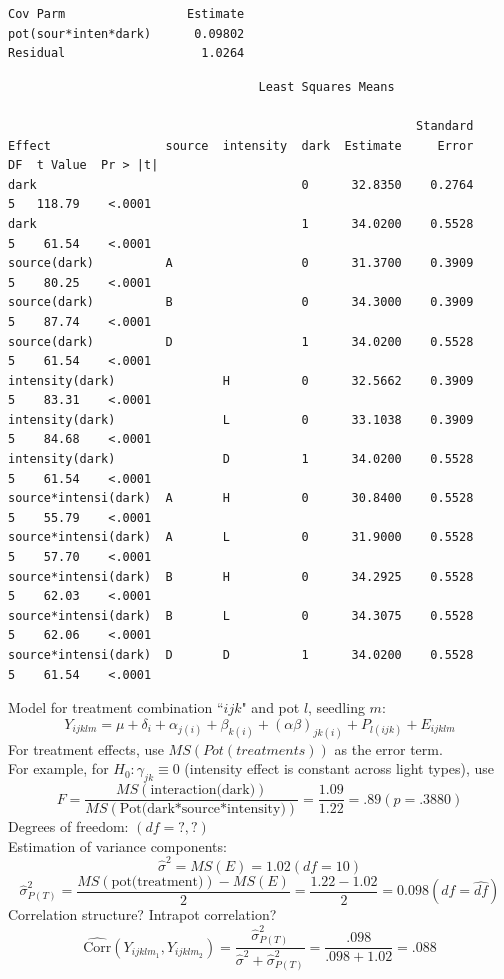 \begin{LARGE}
\begin{small}
\begin{verbatim}
Cov Parm                 Estimate
pot(sour*inten*dark)      0.09802
Residual                   1.0264
\end{verbatim}
\newpage
\begin{verbatim}
                                   Least Squares Means
 
                                                         Standard
Effect                source  intensity  dark  Estimate     Error    DF  t Value  Pr > |t|
dark                                     0      32.8350    0.2764     5   118.79    <.0001
dark                                     1      34.0200    0.5528     5    61.54    <.0001
source(dark)          A                  0      31.3700    0.3909     5    80.25    <.0001
source(dark)          B                  0      34.3000    0.3909     5    87.74    <.0001
source(dark)          D                  1      34.0200    0.5528     5    61.54    <.0001
intensity(dark)               H          0      32.5662    0.3909     5    83.31    <.0001
intensity(dark)               L          0      33.1038    0.3909     5    84.68    <.0001
intensity(dark)               D          1      34.0200    0.5528     5    61.54    <.0001
source*intensi(dark)  A       H          0      30.8400    0.5528     5    55.79    <.0001
source*intensi(dark)  A       L          0      31.9000    0.5528     5    57.70    <.0001
source*intensi(dark)  B       H          0      34.2925    0.5528     5    62.03    <.0001
source*intensi(dark)  B       L          0      34.3075    0.5528     5    62.06    <.0001
source*intensi(dark)  D       D          1      34.0200    0.5528     5    61.54    <.0001
\end{verbatim}
\end{small}
Model for treatment combination ``$ijk$" and pot $l$, seedling $m$:
$$ Y_{ijklm} = \mu  + \delta_i + \alpha_{j(i)} + \beta_{k(i)} + (\alpha\beta)_{jk(i)} + P_{l(ijk)} + E_{ijklm}$$
For treatment effects, use $MS(Pot(treatments))$ as the error term.  \\
For example, for $H _0: \gamma_{jk}\equiv 0$ (intensity effect is constant across light types), use
$$ F=\frac{MS(\mbox{interaction(dark)})}{MS(\mbox{Pot(dark*source*intensity)})} = \frac{1.09}{1.22}=.89 (p=.3880)$$ 
Degrees of freedom: $(df=?,?)$ \\
Estimation of variance components:
$$\hat\sigma^2 = MS(E) = 1.02 (df=10)$$
$$\hat\sigma_{P(T)}^2 = \frac{MS(\mbox{pot(treatment)})-MS(E)}{2} = \frac{1.22-1.02}{2} = 0.098 (df=\widehat{df})$$
Correlation structure?  Intrapot correlation?
$$ \widehat{\mbox{Corr}} (Y_{ijklm_1},Y_{ijklm_2}) = \frac{\hat\sigma_{P(T)}^2}{\hat\sigma^2 + \hat\sigma_{P(T)}^2}=\frac{.098}{.098+1.02}=.088$$
\end{LARGE} 













